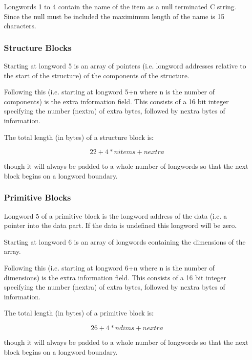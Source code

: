 Longwords 1 to 4 contain the name of the item as a null terminated C string.
Since the null must be included the maximimum length of the name is 15
characters.

\subsubsection{Structure Blocks}

Starting at longword 5 is an array of pointers (i.e. longword addresses
relative to the start of the structure) of the components of the structure.

Following this (i.e. starting at longword 5+n where n is the number of
components) is the extra information field. This consists of a 16 bit integer
specifying the number (nextra) of extra bytes, followed by nextra bytes of
information.

The total length (in bytes) of a structure block is:

\begin{displaymath}
      22 + 4*nitems + nextra  
\end{displaymath}

though it will always be padded to a whole number of longwords so that the next
block begins on a longword boundary.

\subsubsection{Primitive Blocks}

Longword 5 of a primitive block is the longword address of the data (i.e. a
pointer into the data part. If the data is undefined this longword will be
zero.

Starting at longword 6 is an array of longwords containing the dimensions
of the array.

Following this (i.e. starting at longword 6+n where n is the number of
dimensions) is the extra information field. This consists of a 16 bit integer
specifying the number (nextra) of extra bytes, followed by nextra bytes of
information.

The total length (in bytes) of a primitive block is:

\begin{displaymath}
      26 + 4*ndims + nextra
\end{displaymath}

though it will always be padded to a whole number of longwords so that the next
block begins on a longword boundary.

